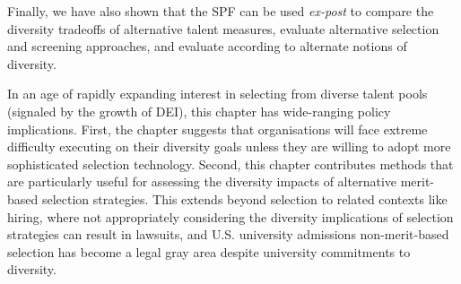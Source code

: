 Finally, we have also shown that the SPF can be used \emph{ex-post} to compare the diversity tradeoffs of alternative talent measures, evaluate alternative selection and screening approaches, and evaluate according to alternate notions of diversity. 

In an age of rapidly expanding interest in selecting from diverse talent pools (signaled by the growth of DEI), this chapter has wide-ranging policy implications. First, the chapter suggests that organisations will face extreme difficulty executing on their diversity goals unless they are willing to adopt more sophisticated selection technology. Second, this chapter contributes methods that are particularly useful for assessing the diversity impacts of alternative merit-based selection strategies. This extends beyond selection to related contexts like hiring, where not appropriately considering the diversity implications of selection strategies can result in lawsuits, and U.S. university admissions non-merit-based selection has become a legal gray area despite university commitments to diversity. 